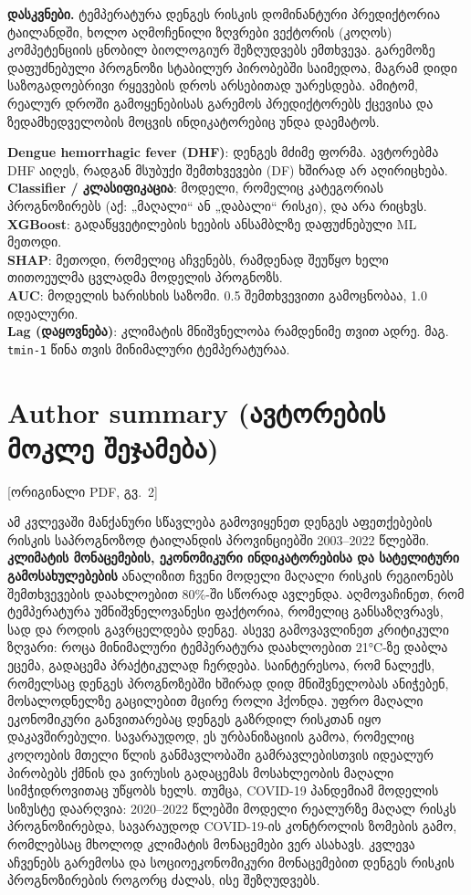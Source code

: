 \documentclass[11pt,a4paper]{article}
\newcommand{\imp}[1]{\textbf{\color{importred}#1}}
\newcommand{\pg}[1]{{\small\color{gray}[ორიგინალი PDF, გვ.~#1]}}
\begin{document}
\textbf{დასკვნები.} ტემპერატურა დენგეს რისკის დომინანტური პრედიქტორია ტაილანდში, ხოლო აღმოჩენილი
ზღვრები ვექტორის (კოღოს) კომპეტენციის ცნობილ ბიოლოგიურ შეზღუდვებს ემთხვევა. გარემოზე დაფუძნებული
პროგნოზი სტაბილურ პირობებში საიმედოა, მაგრამ დიდი საზოგადოებრივი რყევების დროს არსებითად უარესდება.
ამიტომ, რეალურ დროში გამოყენებისას გარემოს პრედიქტორებს ქცევისა და ზედამხედველობის მოცვის
ინდიკატორებიც უნდა დაემატოს.

\begin{termin}
\textbf{Dengue hemorrhagic fever (DHF)}: დენგეს მძიმე ფორმა. ავტორებმა DHF აიღეს, რადგან მსუბუქი შემთხვევები (DF) ხშირად არ აღირიცხება.\\
\textbf{Classifier / კლასიფიკაცია}: მოდელი, რომელიც კატეგორიას პროგნოზირებს (აქ: „მაღალი“ ან „დაბალი“ რისკი), და არა რიცხვს.\\
\textbf{XGBoost}: გადაწყვეტილების ხეების ანსამბლზე დაფუძნებული ML მეთოდი.\\
\textbf{SHAP}: მეთოდი, რომელიც აჩვენებს, რამდენად შეუწყო ხელი თითოეულმა ცვლადმა მოდელის პროგნოზს.\\
\textbf{AUC}: მოდელის ხარისხის საზომი. 0.5 შემთხვევითი გამოცნობაა, 1.0 იდეალური.\\
\textbf{Lag (დაყოვნება)}: კლიმატის მნიშვნელობა რამდენიმე თვით ადრე. მაგ. \texttt{tmin-1} წინა თვის მინიმალური ტემპერატურაა.
\end{termin}

\section{Author summary (ავტორების მოკლე შეჯამება)} \pg{2}

ამ კვლევაში მანქანური სწავლება გამოვიყენეთ დენგეს აფეთქებების რისკის საპროგნოზოდ ტაილანდის პროვინციებში
2003--2022 წლებში. \imp{კლიმატის მონაცემების, ეკონომიკური ინდიკატორებისა და სატელიტური გამოსახულებების} ანალიზით
ჩვენი მოდელი მაღალი რისკის რეგიონებს შემთხვევების დაახლოებით 80\%-ში სწორად ავლენდა.
აღმოვაჩინეთ, რომ ტემპერატურა უმნიშვნელოვანესი ფაქტორია, რომელიც განსაზღვრავს, სად და როდის გავრცელდება დენგე.
ასევე გამოვავლინეთ კრიტიკული ზღვარი: როცა მინიმალური ტემპერატურა დაახლოებით 21°C-ზე დაბლა ეცემა,
გადაცემა პრაქტიკულად ჩერდება. საინტერესოა, რომ ნალექს, რომელსაც დენგეს პროგნოზებში ხშირად დიდ
მნიშვნელობას ანიჭებენ, მოსალოდნელზე გაცილებით მცირე როლი ჰქონდა. უფრო მაღალი ეკონომიკური განვითარებაც
დენგეს გაზრდილ რისკთან იყო დაკავშირებული. სავარაუდოდ, ეს ურბანიზაციის გამოა, რომელიც კოღოების
მთელი წლის განმავლობაში გამრავლებისთვის იდეალურ პირობებს ქმნის და ვირუსის გადაცემას მოსახლეობის მაღალი
სიმჭიდროვითაც უწყობს ხელს. თუმცა, COVID-19 პანდემიამ მოდელის სიზუსტე დაარღვია: 2020--2022 წლებში
მოდელი რეალურზე მაღალ რისკს პროგნოზირებდა, სავარაუდოდ COVID-19-ის კონტროლის ზომების გამო,
რომლებსაც მხოლოდ კლიმატის მონაცემები ვერ ასახავს. კვლევა აჩვენებს გარემოსა და სოციოეკონომიკური
მონაცემებით დენგეს რისკის პროგნოზირების როგორც ძალას, ისე შეზღუდვებს.
\end{document}
